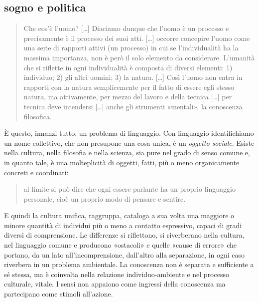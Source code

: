 \documentclass{../../lib/gs}
\begin{document}
\subsection{sogno e politica}

\begin{quote}
  Che cos'è l'uomo? %
  [\ldots] Diaciamo dunque che l'uomo è un processo e precisamente è il
  processo dei suoi atti. [\ldots] occorre concepire l'uomo come una serie di
  rapporti attivi (un processo) in cui se l'individualità ha la massima
  importanza, non è però il solo elemento da considerare. L'umanità che si
  riflette in ogni individualità è composta di diversi elementi: 1) individuo;
  2) gli altri uomini; 3) la natura. [\ldots] Così l'uomo non entra in rapporti
  con la natura semplicemente per il fatto di essere egli stesso natura, ma
  attivamente, per mezzo del lavoro e della tecnica [\ldots] per tecnica deve
  intendersi [\ldots] anche gli strumenti «mentali», la conoscenza filosofica.
\end{quote}%

È questo, innanzi tutto, un problema di linguaggio. Con linguaggio identifichiamo
un nome collettivo, che non presupone una cosa unica, è un \emph{oggetto sociale}.
\cite{ag:matst, ferraris2014} Esiste nella cultura, nella filosofia e nella
scienza, sia pure nel grado di senso comune e, in quanto tale, è una
molteplicità di oggetti, fatti, più o meno organicamente concreti e coordinati:

\begin{quote}
  al limite si può dire che ogni essere parlante ha un proprio linguaggio
  personale, cioè un proprio modo di pensare e sentire. \cite{ag:matst}
\end{quote}

E quindi la cultura unifica, raggruppa, cataloga a sua volta una maggiore o
minore quantità di individui più o meno a contatto espressivo, capaci di gradi
diversi di comprensione. Le differenze si riflettono, si riverberano nella
cultura, nel linguaggio comune e producono «ostacoli» e quelle «cause di errore»
che portano, da un lato all'incomprensione, dall'altro alla separazione, in
ogni caso riverbera in un problema ambientale. La conoscenza non è separata e
sufficiente a sé stessa, ma è coinvolta nella relazione individuo-ambiente e
nel processo culturale, vitale. I sensi non appaiono come ingressi della
conoscenza ma partecipano come stimoli all’azione.
\end{document}
